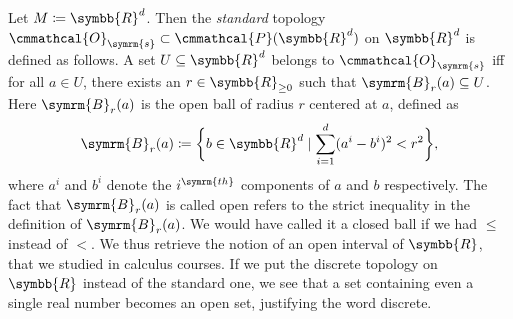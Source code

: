 \documentclass[a4 paper, 12pt]{book}
\renewcommand{\mathcal}{\cmmathcal}
\renewcommand{\mathcal}{\cmmathcal}
\let\symcal\mathcal
\theoremstyle{definition}
\newcommand{\rr}{\symbb{R}}
\newcommand{\topology}{\symcal{O}}
\newcommand{\powerset}{\symcal{P}}
\newcommand{\ball}{\symrm{B}}
\begin{document}
    Let \(M \coloneq \rr^d\). Then the \textit{standard} topology \(\topology_{\symrm{s}} \subset \powerset(\rr^d)\) on \(\rr^d\) is defined as follows. A set \(U \subseteq \rr^d\) belongs to \(\topology_{\symrm{s}}\) iff for all \(a \in U\), there exists an \(r \in \rr_{\geq 0}\) such that \(\ball_r(a) \subseteq U\). Here \(\ball_r(a)\) is the open ball of radius \(r\) centered at \(a\), defined as \[\ball_r(a) \coloneq \bigg\{b \in \rr^d \mid \sum_{i=1}^d (a^i - b^i)^2 < r^2\bigg\},\] where \(a^i\) and \(b^i\) denote the \(i^{\symrm{th}}\) components of \(a\) and \(b\) respectively. The fact that \(\ball_r(a)\) is called open refers to the strict inequality in the definition of \(\ball_r(a)\). We would have called it a closed ball if we had \(\leq\) instead of \(<\). We thus retrieve the notion of an open interval of \(\rr\), that we studied in calculus courses. If we put the discrete topology on \(\rr\) instead of the standard one, we see that a set containing even a single real number becomes an open set, justifying the word discrete.
    \nocite{*}
    \printbibliography[heading=bibintoc]
\end{document}
